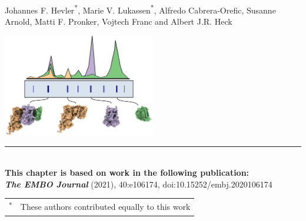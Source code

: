  \label{ch-2}
\vspace*{0.25cm}

\footnotesize Johannes F. Hevler\textsuperscript{*}, Marie V. Lukassen\textsuperscript{*}, Alfredo Cabrera-Orefic, Susanne Arnold, Matti F. Pronker, Vojtech Franc and Albert J.R. Heck
%
\begin{center}
	\vspace{1.5cm}
	\includegraphics[width=0.5\textwidth]{Chapter.2/Figures/chapter_cover.png}
	\vspace{1cm}
\end{center}
%
\begin{flushleft}
	\vspace*{\fill}
	\rule{\textwidth}{1pt}\\[0cm]
	\textbf{This chapter is based on work in the following publication:}\\
	\footnotesize
	\textbf{\emph{The EMBO Journal}} (2021), 40:e106174, doi:10.15252/embj.2020106174\\
	\footnotesize
	\vspace{0.3cm}
	\begin{tabular}[t]{p{}p{}}
		\textsuperscript{*} & These authors contributed equally to this work \\
	\end{tabular}
\end{flushleft}
%

